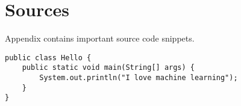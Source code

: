 \chapter{Sources}

Appendix contains important source code snippets.

\begin{lstlisting}[caption={Lines of code}]
public class Hello {
    public static void main(String[] args) {
        System.out.println("I love machine learning");
    }
}
\end{lstlisting}
